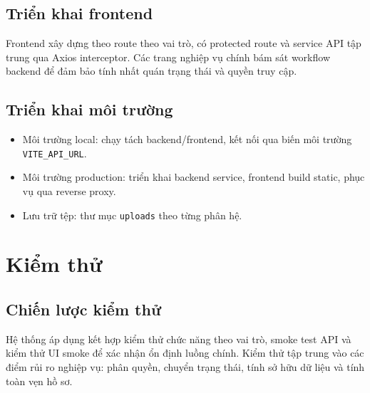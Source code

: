 \documentclass[12pt,a4paper]{report}
\begin{document}
\section{Triển khai frontend}
Frontend xây dựng theo route theo vai trò, có protected route và service API tập trung qua Axios interceptor. Các trang nghiệp vụ chính bám sát workflow backend để đảm bảo tính nhất quán trạng thái và quyền truy cập.

\section{Triển khai môi trường}
\begin{itemize}[leftmargin=1.2cm]
\item Môi trường local: chạy tách backend/frontend, kết nối qua biến môi trường \texttt{VITE\_API\_URL}.
\item Môi trường production: triển khai backend service, frontend build static, phục vụ qua reverse proxy.
\item Lưu trữ tệp: thư mục \texttt{uploads} theo từng phân hệ.
\end{itemize}

\chapter{Kiểm thử}
\section{Chiến lược kiểm thử}
Hệ thống áp dụng kết hợp kiểm thử chức năng theo vai trò, smoke test API và kiểm thử UI smoke để xác nhận ổn định luồng chính. Kiểm thử tập trung vào các điểm rủi ro nghiệp vụ: phân quyền, chuyển trạng thái, tính sở hữu dữ liệu và tính toàn vẹn hồ sơ.
\end{document}
